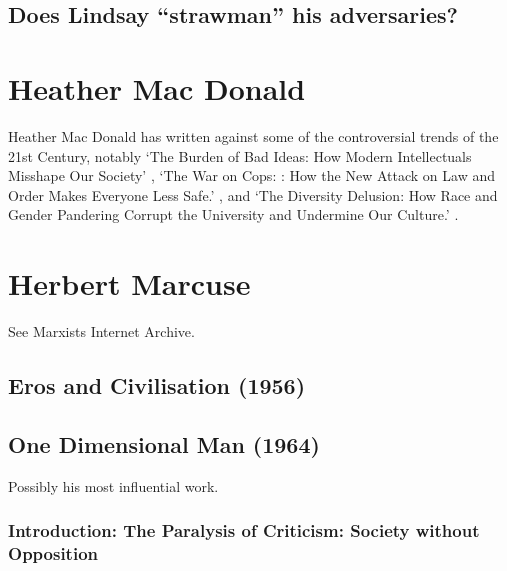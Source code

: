 \documentclass[10pt,titlepage]{book}
\newcommand{\ignore}[1]{}
\begin{document}
\subsection{Does Lindsay ``strawman'' his adversaries?}

\ignore{

This has been alleged.
While not by any means constituting an authority on Lindsay, the accusation strikes me as so far off the mark that I wanted to respond with a short twitter thread.

This section is to play with that idea, it might not get anywhere, its probably too hard to do it in a small number of words.

}%

\section{Heather Mac Donald \cite{macdonald-bbi, macdonald-woc, macdonald-tdd}}\label{MacDonaldHeather}

Heather Mac Donald has written against some of the controversial trends of the 21st Century, notably `The Burden of Bad Ideas: How Modern Intellectuals Misshape Our Society' \cite{macdonald-bbi}, `The War on Cops: : How the New Attack
on Law and Order Makes Everyone Less Safe.' \cite{macdonald-woc}, and `The Diversity Delusion: How Race and
Gender Pandering Corrupt the University and Undermine Our
Culture.' \cite{macdonald-tdd}.

\section{Herbert Marcuse}\label{MarcuseHerbert}

See Marxists Internet Archive\cite{marcuse-mia}.

\subsection{Eros and Civilisation (1956) \cite{marcuse1956eros}}

\subsection{One Dimensional Man (1964) \cite{marcuse-one-dim}}

Possibly his most influential work.

\subsubsection{Introduction: The Paralysis of Criticism: Society without Opposition}
\end{document}
